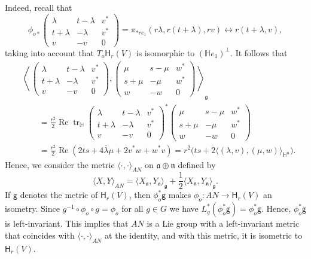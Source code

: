 \documentclass[12pt, a4paper,draft]{amsart}
\newcommand{\g}{\mathfrak}
\newcommand{\tr}{\operatorname{tr}}
\renewcommand{\H}{\mathbb{H}}
\renewcommand{\Re}{\operatorname{Re}}
\theoremstyle{remark}
\begin{document}
Indeed, recall that 
\[
\phi_{o*}\left(
\begin{array}{cc|c}
	\lambda & t-\lambda & v^*\\
	t+\lambda & -\lambda & v^*\\
	\hline
	v & -v & 0
\end{array}
\right)
=\pi_{*re_1}(r\lambda,r(t+\lambda),rv)
\leftrightarrow r(t+\lambda,v),
\]
taking into account that $T_o\mathsf{H}_r(V)$ is isomorphic to $(\H e_1)^\perp$.
It follows that
\[
\begin{aligned}
&\left\langle\,
\left(
\begin{array}{cc|c}
	\lambda & t-\lambda & v^*\\
	t+\lambda & -\lambda & v^*\\
	\hline
	v & -v & 0
\end{array}
\right),
\left(
\begin{array}{cc|c}
	\mu & s-\mu & w^*\\
	s+\mu & -\mu & w^*\\
	\hline
	w & -w & 0
\end{array}
\right)\,
\right\rangle_{\g{g}}\\
&{}\qquad=\frac{r^2}{2}\Re\tr_\H \left(
\begin{array}{cc|c}
	\lambda & t-\lambda & v^*\\
	t+\lambda & -\lambda & v^*\\
	\hline
	v & -v & 0
\end{array}
\right)^*
\left(
\begin{array}{cc|c}
	\mu & s-\mu & w^*\\
	s+\mu & -\mu & w^*\\
	\hline
	w & -w & 0
\end{array}
\right)\\
&{}\qquad=\frac{r^2}{2}\Re(2ts+4\overline{\lambda}\mu+2v^*w+w^*v)
=r^2\bigl(ts+2\langle (\lambda,v),(\mu,w)\rangle_{\H^n}\bigr).
\end{aligned}
\]
Hence, we consider the metric $\langle\cdot,\cdot \rangle_{AN}$ on $\g{a}\oplus\g{n}$ defined by
\[
\langle X,Y \rangle_{AN}
=\langle X_{\g{a}},Y_{\g{a}} \rangle_\g{g}+\frac{1}{2}\langle X_{\g{n}},Y_{\g{n}}\rangle_\g{g}.
\]
If $\mathsf{g}$ denotes the metric of $\mathsf{H}_r(V)$, then $\phi_o^*\mathsf{g}$ makes $\phi_o\colon AN\to \mathsf{H}_r(V)$ an isometry. 
Since $g^{-1}\circ\phi_o\circ g=\phi_o$ for all $g\in G$ we have $L_g^*(\phi_o^*\mathsf{g})=\phi_o^*\mathsf{g}$.
Hence, $\phi_o^*\mathsf{g}$ is left-invariant.
This implies that $AN$ is a Lie group with a left-invariant metric that coincides with $\langle\cdot,\cdot \rangle_{AN}$ at the identity, and with this metric, it is isometric to $\mathsf{H}_r(V)$.
\end{document}
